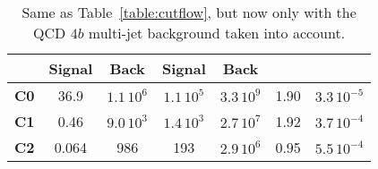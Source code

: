 \begin{table}[t]
\begin{tabular}{c|c|c|c|c|c|c}
      &    Signal & Back   &  Signal  & Back
    &   & \\
    \hline
 {\bf C0}  &  36.9  & $1.1\,10^{6}$ & $1.1\,10^5$ & $3.3\,10^{9}$  &  1.90 & $3.3\,10^{-5}$\\
        {\bf C1}  &  0.46    & $9.0\,10^3$    &  $1.4\,10^3$   & $2.7\,10^7$     & 1.92     &  $3.7\,10^{-4}$ \\
        {\bf C2}  &  0.064     &  986     &  193   &  $2.9\,10^6$    &  0.95  &  $5.5\,10^{-4}$ \\
        \hline
  \end{tabular}
  \caption{\small Same as Table~\ref{table:cutflow}, but now
    only with the QCD $4b$ multi-jet background taken into account.
    \label{table:cutflow4B}
  }
\end{table}
